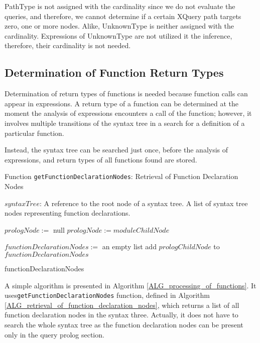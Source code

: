 PathType is not assigned with the cardinality since we do not evaluate the queries, and therefore, we cannot determine if a certain XQuery path targets zero, one or more nodes. Alike, UnknownType is neither assigned with the cardinality. Expressions of UnknownType are not utilized it the inference, therefore, their cardinality is not needed.

\subsection{Determination of Function Return Types}
Determination of return types of functions is needed because function calls can appear in expressions. A return type of a function can be determined at the moment the analysis of expressions encounters a call of the function; however, it involves multiple transitions of the syntax tree in a search for a definition of a particular function.

Instead, the syntax tree can be searched just once, before the analysis of expressions, and return types of all functions found are stored.

\begin{algorithm}
\caption{Function \texttt{getFunctionDeclarationNodes}: Retrieval of Function Declaration Nodes}
\label{ALG_retrieval_of_function_declaration_nodes}
\begin{algorithmic}[1]
\REQUIRE $syntaxTree$: A reference to the root node of a syntax tree.
\ENSURE A list of syntax tree nodes representing function declarations.

\STATE $prologNode :=$ null
        \STATE $prologNode := moduleChildNode$
    \ENDIF
\ENDFOR

\STATE $functionDeclarationNodes :=$ an empty list
            \STATE add $prologChildNode$ to $functionDeclarationNodes$
        \ENDIF
    \ENDFOR
\ENDIF

\RETURN functionDeclarationNodes
\end{algorithmic}
\end{algorithm}

A simple algorithm is presented in Algorithm \ref{ALG_processing_of_functions}. It uses\linebreak \texttt{getFunctionDeclarationNodes} function, defined in Algorithm \ref{ALG_retrieval_of_function_declaration_nodes}, which returns a list of all function declaration nodes in the syntax three. Actually, it does not have to search the whole syntax tree as the function declaration nodes can be present only in the query prolog section. 

